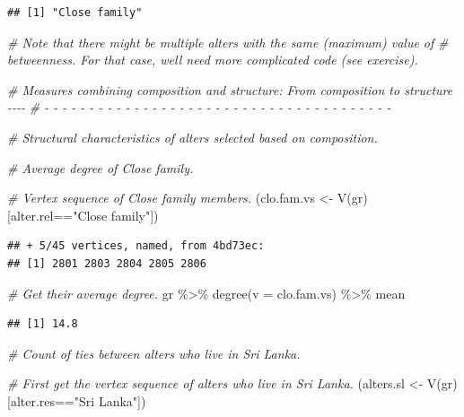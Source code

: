 \documentclass[
]{book}
\newenvironment{Shaded}{\begin{snugshade}}{\end{snugshade}}
\newcommand{\AttributeTok}[1]{\textcolor[rgb]{0.77,0.63,0.00}{#1}}
\newcommand{\CommentTok}[1]{\textcolor[rgb]{0.56,0.35,0.01}{\textit{#1}}}
\newcommand{\FunctionTok}[1]{\textcolor[rgb]{0.00,0.00,0.00}{#1}}
\newcommand{\NormalTok}[1]{#1}
\newcommand{\OtherTok}[1]{\textcolor[rgb]{0.56,0.35,0.01}{#1}}
\newcommand{\SpecialCharTok}[1]{\textcolor[rgb]{0.00,0.00,0.00}{#1}}
\newcommand{\StringTok}[1]{\textcolor[rgb]{0.31,0.60,0.02}{#1}}
\begin{document}
\begin{verbatim}
## [1] "Close family"
\end{verbatim}

\begin{Shaded}
\begin{Highlighting}[]
\CommentTok{\# Note that there might be multiple alters with the same (maximum) value of }
\CommentTok{\# betweenness. For that case, we\textquotesingle{}ll need more complicated code (see exercise).}

\CommentTok{\# Measures combining composition and structure: From composition to structure {-}{-}{-}{-}}
\CommentTok{\# {-} {-} {-} {-} {-} {-} {-} {-} {-} {-} {-} {-} {-} {-} {-} {-} {-} {-} {-} {-} {-} {-} {-} {-} {-} {-} {-} {-} {-} {-} {-} {-} {-} {-} {-} {-} {-} {-} {-} }

\CommentTok{\# Structural characteristics of alters selected based on composition.}

\CommentTok{\# Average degree of Close family.}

\CommentTok{\# Vertex sequence of Close family members.}
\NormalTok{(clo.fam.vs }\OtherTok{\textless{}{-}} \FunctionTok{V}\NormalTok{(gr)[alter.rel}\SpecialCharTok{==}\StringTok{"Close family"}\NormalTok{])}
\end{Highlighting}
\end{Shaded}

\begin{verbatim}
## + 5/45 vertices, named, from 4bd73ec:
## [1] 2801 2803 2804 2805 2806
\end{verbatim}

\begin{Shaded}
\begin{Highlighting}[]
\CommentTok{\# Get their average degree.}
\NormalTok{gr }\SpecialCharTok{\%\textgreater{}\%}
  \FunctionTok{degree}\NormalTok{(}\AttributeTok{v =}\NormalTok{ clo.fam.vs) }\SpecialCharTok{\%\textgreater{}\%} 
\NormalTok{  mean}
\end{Highlighting}
\end{Shaded}

\begin{verbatim}
## [1] 14.8
\end{verbatim}

\begin{Shaded}
\begin{Highlighting}[]
\CommentTok{\# Count of ties between alters who live in Sri Lanka.}

\CommentTok{\# First get the vertex sequence of alters who live in Sri Lanka.}
\NormalTok{(alters.sl }\OtherTok{\textless{}{-}} \FunctionTok{V}\NormalTok{(gr)[alter.res}\SpecialCharTok{==}\StringTok{"Sri Lanka"}\NormalTok{])}
\end{Highlighting}
\end{Shaded}
\end{document}
